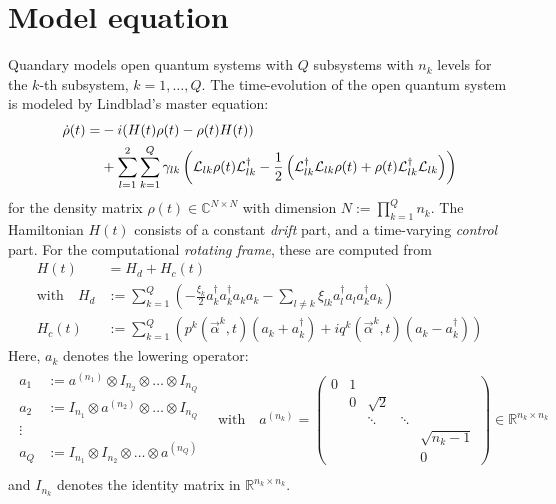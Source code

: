 \documentclass[letterpaper]{article}
\newcommand{\Ell}{\mathcal{L}}
\newcommand{\R}{\mathds{R}}
\newcommand{\C}{\mathds{C}}
\begin{document}
\section{Model equation}
Quandary models open quantum systems with $Q$ subsystems with $n_k$ levels for the
$k$-th subsystem, $k=1,\dots,Q$. The time-evolution of the open quantum system is modeled by Lindblad's master equation:
\begin{align}\label{mastereq}
  \dot \rho(t) = &-i(H(t)\rho(t) - \rho(t)H(t)) \notag \\
  &+ \sum_{l=1}^2 \sum_{k=1}^Q \gamma_{lk} \left( \Ell_{lk} \rho(t)
  \Ell_{lk}^{\dagger} - \frac 1 2 \left( \Ell_{lk}^{\dagger}\Ell_{lk}
  \rho(t) + \rho(t)\Ell_{lk}^{\dagger} \Ell_{lk}\right) \right)
\end{align}
for the density matrix $\rho(t)\in \C^{N\times N}$ with dimension $N :=
\prod_{k=1}^Q n_k$. The Hamiltonian $H(t)$ consists of a constant \textit{drift}
part, and a time-varying \textit{control} part. For the computational
\textit{rotating frame}, these are computed from
\begin{align}
  H(t) &= H_d + H_c(t) \\
  \text{with} \quad H_d &:= \sum_{k=1}^Q \left(- \frac{\xi_k}{2}
  a_k^{\dagger}a_k^{\dagger}a_k a_k - \sum_{l\neq k} \xi_{lk} a_l^{\dagger}a_l
  a_k^{\dagger} a_k  \right) \\
   H_c(t) &:= \sum_{k=1}^Q \left( p^k(\vec{\alpha}^k,t) (a_k +
   a_k^{\dagger}) + i q^k(\vec{\alpha}^k,t)(a_k - a_k^{\dagger})
   \right)
\end{align}
Here, $a_k$ denotes the lowering operator:
\begin{align}
  \begin{array}{rl}
  a_1 &:= a^{(n_1)} \otimes I_{n_2} \otimes \dots \otimes I_{n_Q}\\
  a_2 &:= I_{n_1} \otimes a^{(n_2)} \otimes \dots \otimes I_{n_Q}\\
  \vdots \, & \\
  a_Q &:= I_{n_1} \otimes I_{n_2} \otimes \dots \otimes a^{(n_Q)}\\
  \end{array}
  \quad \text{with}\quad
 a^{(n_k)} = \begin{pmatrix}
   0 & 1 &          &         &    \\
     & 0 & \sqrt{2} &         &     \\
     &   & \ddots   & \ddots  &    \\
     &   &          &         & \sqrt{n_k-1}  \\
     &   &          &         & 0   
 \end{pmatrix} \in \R^{n_k \times n_k}
\end{align}
and $I_{n_k}$ denotes the identity matrix in $\R^{n_k \times n_k}$.
\end{document}
